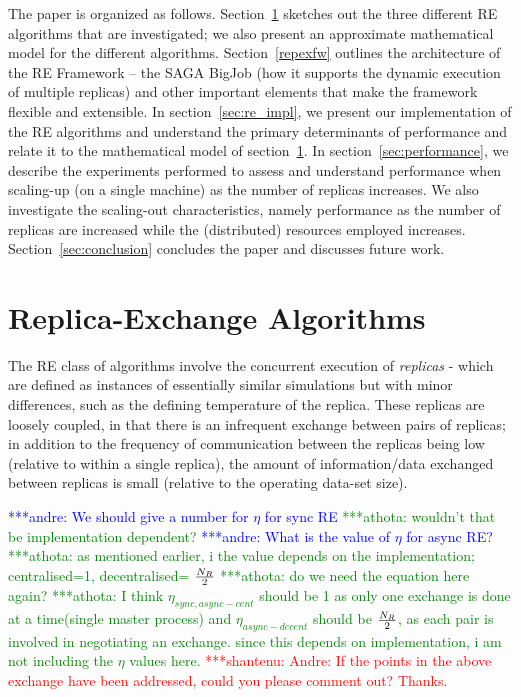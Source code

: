 \documentclass{rspublic}
\newcommand{\jhanote}[1]{ {\textcolor{red} { ***shantenu: #1 }}}
\newcommand{\alnote}[1]{ {\textcolor{blue} { ***andre: #1 }}}
\newcommand{\athotanote}[1]{ {\textcolor{green} { ***athota: #1 }}}
\newcommand{\alnote}[1]{}
\newcommand{\athotanote}[1]{}
\newcommand{\jhanote}[1]{}
\begin{document}
The paper is organized as follows. Section~\ref{sec:repex-approach}
sketches out the three different RE algorithms that are investigated; 
we also present an approximate mathematical model for the different algorithms.  
Section~\ref{repexfw} outlines the architecture of the RE Framework -- the SAGA BigJob
(how it supports the dynamic execution of multiple replicas) and other
important elements that make the framework flexible and extensible.
In section~\ref{sec:re_impl}, we present our implementation of the RE algorithms and
understand the primary determinants of performance and relate it to
the mathematical model of section~\ref{sec:repex-approach}.  
In section~\ref{sec:performance}, we describe the experiments performed 
to assess and understand performance when scaling-up (on a single machine) 
as the number of replicas increases. We also investigate the scaling-out
characteristics, namely performance as the number of replicas are
increased while the (distributed) resources employed
increases. %
Section~\ref{sec:conclusion} concludes the paper and discusses future work.


\section{Replica-Exchange Algorithms}\label{sec:repex-approach}

The RE class of algorithms involve the concurrent execution of
\emph{replicas} - which are defined as instances of essentially
similar simulations but with minor differences, such as the defining
temperature of the replica. These replicas are loosely coupled, in
that there is an infrequent exchange between pairs of 
replicas; in addition to the frequency of communication between the
replicas being low (relative to within a single replica), the amount
of information/data exchanged between replicas is small (relative to
the operating data-set size).

\alnote{We should give a number for $\eta$ for sync
  RE}\athotanote{wouldn't that be implementation dependent?}
\alnote{What is the value of $\eta$ for async RE?} \athotanote{as
  mentioned earlier, i the value depends on the implementation;
  centralised=1, decentralised= $N_R\over2$} \athotanote{do we need
  the equation here again?}  \athotanote{I think
  $\eta_{sync,async-cent}$ should be 1 as only one exchange is done at
  a time(single master process) and $\eta_{async-decent}$ should be
  $N_R \over 2$, as each pair is involved in negotiating an
  exchange. since this depends on implementation, i am not including
  the $\eta$ values here.} \jhanote{Andre: If the points in the above
  exchange have been addressed, could you please comment out? Thanks.}
\end{document}
